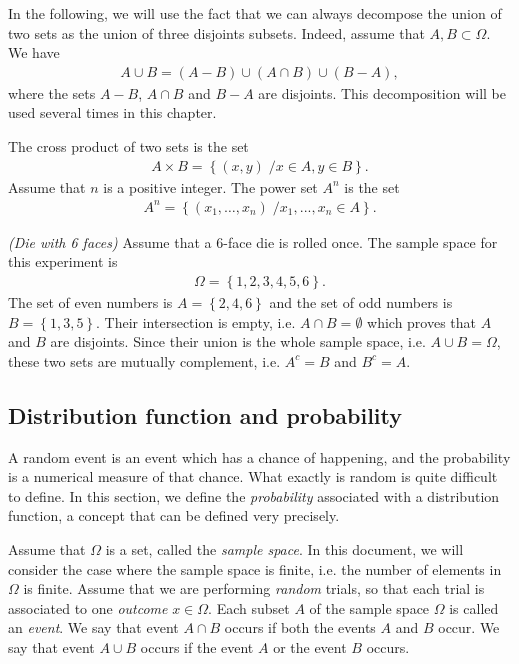 In the following, we will use the fact that we can always decompose 
the union of two sets as the union of three disjoints subsets.
Indeed, assume that $A,B\subset \Omega$. 
We have
\begin{eqnarray}
A\cup B = (A-B) \cup (A\cap B) \cup (B-A),
\end{eqnarray}
where the sets $A-B$, $A\cap B$ and $B-A$ are disjoints.
This decomposition will be used several times in this chapter.

The cross product of two sets is the set
\begin{eqnarray}
A\times B = \left\{(x,y)\; / x \in A , y\in B\right\}.
\end{eqnarray}
Assume that $n$ is a positive integer.
The power set $A^n$ is the set
\begin{eqnarray}
A^n = \left\{(x_1,\ldots,x_n)\; / x_1,...,x_n \in A\right\}.
\end{eqnarray}

\begin{example}
\emph{(Die with 6 faces)}
\label{introstats-die6faces-sets}
Assume that a 6-face die is rolled once. The sample space for this experiment is
\begin{eqnarray}
\Omega=\left\{1,2,3,4,5,6\right\}.
\end{eqnarray}
The set of even numbers is $A=\left\{2,4,6\right\}$ and the 
set of odd numbers is $B=\left\{1,3,5\right\}$. Their 
intersection is empty, i.e. $A\cap B=\emptyset$ which proves that $A$ and $B$ 
are disjoints. Since their union is the whole sample space, i.e. $A\cup B=\Omega$,
these two sets are mutually complement, i.e. $A^c = B$ and $B^c = A$.
\end{example}

\subsection{Distribution function and probability}
A random event is an event which has a chance of happening, and 
the probability is a numerical measure of that chance.
What exactly is random is quite difficult to define.
In this section, we define the \emph{probability} associated 
with a distribution function, a concept that can be defined very precisely.

Assume that $\Omega$ is a set, called the \emph{sample space}. 
In this document, we will consider the case where the 
sample space is finite, i.e. the number of elements in $\Omega$ is finite.
Assume that we are performing \emph{random} trials, 
so that each trial is associated to one \emph{outcome} $x\in \Omega$.
Each subset $A$ of the sample space $\Omega$ is called an \emph{event}.
We say that event $A\cap B$ occurs if both the events $A$ and $B$ occur.
We say that event $A\cup B$ occurs if the event $A$ or the event $B$ occurs.

